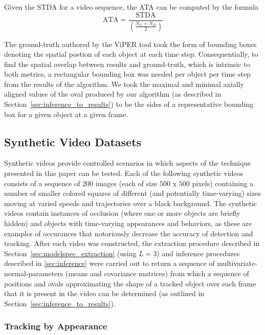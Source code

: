 \documentclass[smallcondensed, final]{svjour3}
\begin{document}
Given the STDA for a video sequence, the ATA can be computed by the formula
\begin{equation}
\text{ATA} = \frac{\text{STDA}}{\left( \frac{N_{G} + N_{D}}{2} \right)}
\end{equation}

The ground-truth authored by the ViPER tool took the form of bounding boxes denoting the spatial postion of each object at each time step. Consequentially, to find the spatial overlap between results and ground-truth, which is intrinsic to both metrics, a rectangular bounding box was needed per object per time step from the results of the algorithm. We took the maximal and minimal axially aligned values of the oval produced by our algorithm (as described in Section~\ref{sec:inference_to_results}) to be the sides of a representative bounding box for a given object at a given frame.

\subsection{Synthetic Video Datasets}
\label{sec:syntheticvideos}

Synthetic videos provide controlled scenarios in which aspects of the technique presented in this paper can be tested. Each of the following synthetic videos consists of a sequence of 200 images (each of size $500$ x $500$ pixels) containing a number of smaller colored squares of different (and potentially time-varying) sizes moving at varied speeds and trajectories over a black background. The synthetic videos contain instances of occlusion (where one or more objects are briefly hidden) and objects with time-varying appearances and behaviors, as these are examples of occurances that notoriously decrease the accuracy of detection and tracking. After each video was constructed, the extraction procedure described in Section~\ref{sec:modelspec_extraction} (using $L=3$) and inference procedures described in \ref{sec:inference} were carried out to return a sequence of multivariate-normal-parameters (means and covariance matrices) from which a sequence of positions and ovals approximating the shape of a tracked object over each frame that it is present in the video can be determined (as outlined in Section~\ref{sec:inference_to_results}).


\subsubsection{Tracking by Appearance}
\end{document}
